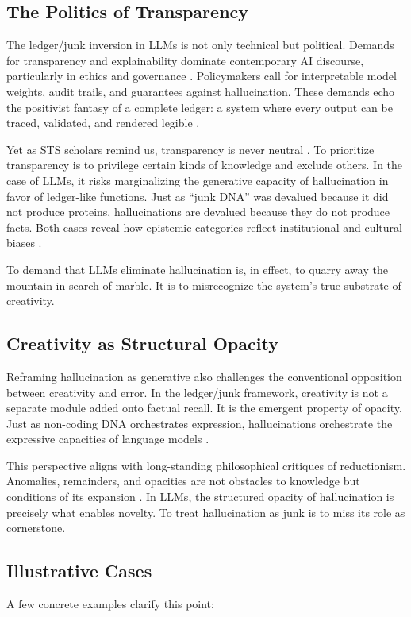 \documentclass[12pt]{article}
\begin{document}
{{{\subsection{The Politics of Transparency}
The ledger/junk inversion in LLMs is not only technical but political. Demands for transparency and explainability dominate contemporary AI discourse, particularly in ethics and governance \citep{burrell2016}. Policymakers call for interpretable model weights, audit trails, and guarantees against hallucination. These demands echo the positivist fantasy of a complete ledger: a system where every output can be traced, validated, and rendered legible \citep{scott1998}.

Yet as STS scholars remind us, transparency is never neutral \citep{jasanoff2004, haraway1988}. To prioritize transparency is to privilege certain kinds of knowledge and exclude others. In the case of LLMs, it risks marginalizing the generative capacity of hallucination in favor of ledger-like functions. Just as ``junk DNA'' was devalued because it did not produce proteins, hallucinations are devalued because they do not produce facts. Both cases reveal how epistemic categories reflect institutional and cultural biases \citep{glissant1997}.

To demand that LLMs eliminate hallucination is, in effect, to quarry away the mountain in search of marble. It is to misrecognize the system’s true substrate of creativity.

\subsection{Creativity as Structural Opacity}
Reframing hallucination as generative also challenges the conventional opposition between creativity and error. In the ledger/junk framework, creativity is not a separate module added onto factual recall. It is the emergent property of opacity. Just as non-coding DNA orchestrates expression, hallucinations orchestrate the expressive capacities of language models \citep{rheinberger1997}.

This perspective aligns with long-standing philosophical critiques of reductionism. Anomalies, remainders, and opacities are not obstacles to knowledge but conditions of its expansion \citep{kuhn1962, feyerabend1975}. In LLMs, the structured opacity of hallucination is precisely what enables novelty. To treat hallucination as junk is to miss its role as cornerstone.

\subsection{Illustrative Cases}
A few concrete examples clarify this point:

}}}
\end{document}
